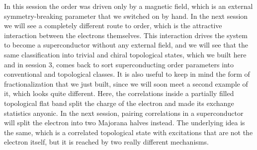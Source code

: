In this session the order was driven only by a magnetic field, which is an external
symmetry-breaking parameter that we switched on by hand. In the next session we will see a
completely different route to order, which is the attractive interaction between the electrons
themselves. This interaction drives the system to become a superconductor without any external
field, and we will see that the same classification into trivial and chiral topological states,
which we built here and in session 3, comes back to sort superconducting order parameters into
conventional and topological classes. It is also useful to keep in mind the form of
fractionalization that we just built, since we will soon meet a second example of it, which looks
quite different. Here, the correlations inside a partially filled topological flat band split the
charge of the electron and made its exchange statistics anyonic. In the next session, pairing
correlations in a superconductor will split the electron into two Majorana halves instead. The
underlying idea is the same, which is a correlated topological state with excitations that are not
the electron itself, but it is reached by two really different mechanisms.
